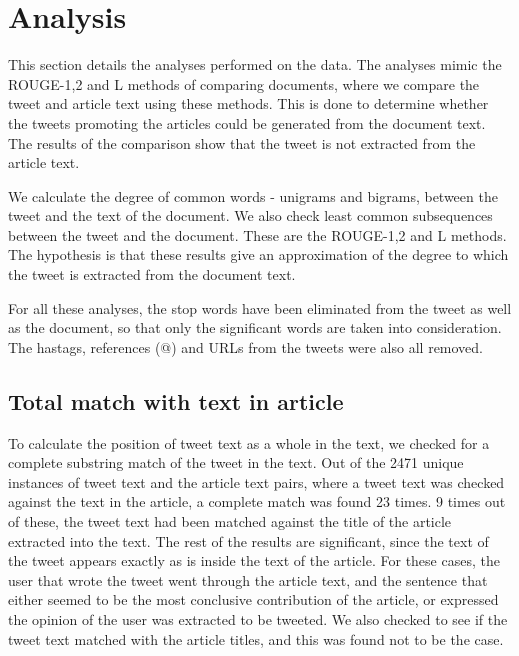 \section{Analysis}

This section details the analyses performed on the data. The analyses mimic the ROUGE-1,2 and L methods of comparing documents, where we compare the tweet and article text using these methods. This is done to determine whether the tweets promoting the articles could be generated from the document text. The results of the comparison show that the tweet is not extracted from the article text. 

We calculate the degree of common words - unigrams and bigrams, between the tweet and the text of the document. We also check least common subsequences between the tweet and the document. These are the ROUGE-1,2 and L methods. The hypothesis is that these results give an approximation of the degree to which the tweet is extracted from the document text. 

For all these analyses, the stop words have been eliminated from the tweet as well as the document, so that only the significant words are taken into consideration. The hastags, references (@) and URLs from the tweets were also all removed.

\subsection {Total match with text in article}

To calculate the position of tweet text as a whole in the text, we checked for a complete substring match of the tweet in the text. Out of the 2471 unique instances of tweet text and the article text pairs, where a tweet text was checked against the text in the article, a complete match was found 23 times. 9 times out of these, the tweet text had been matched against the title of the article extracted into the text. The rest of the results are significant, since the text of the tweet appears exactly as is inside the text of the article. For these cases, the user that wrote the tweet went through the article text, and the sentence that either seemed to be the most conclusive contribution of the article, or expressed the opinion of the user was extracted to be tweeted. We also checked to see if the tweet text matched with the article titles, and this was found not to be the case. 

